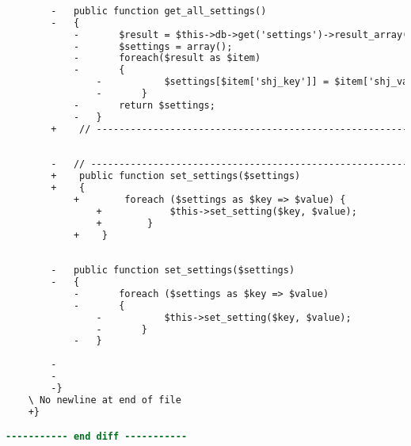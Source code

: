\begin{lstlisting}[language=diff, caption=Perubahan pada kode Settings\_model.php]
		
		-	public function get_all_settings()
		-	{
			-		$result = $this->db->get('settings')->result_array();
			-		$settings = array();
			-		foreach($result as $item)
			-		{
				-			$settings[$item['shj_key']] = $item['shj_value'];
				-		}
			-		return $settings;
			-	}
		+    // ------------------------------------------------------------------------
		
		
		-	// ------------------------------------------------------------------------
		+    public function set_settings($settings)
		+    {
			+        foreach ($settings as $key => $value) {
				+            $this->set_setting($key, $value);
				+        }
			+    }
		
		
		-	public function set_settings($settings)
		-	{
			-		foreach ($settings as $key => $value)
			-		{
				-			$this->set_setting($key, $value);
				-		}
			-	}
		
		-
		-
		-}
	\ No newline at end of file
	+}

----------- end diff -----------
\end{lstlisting}

